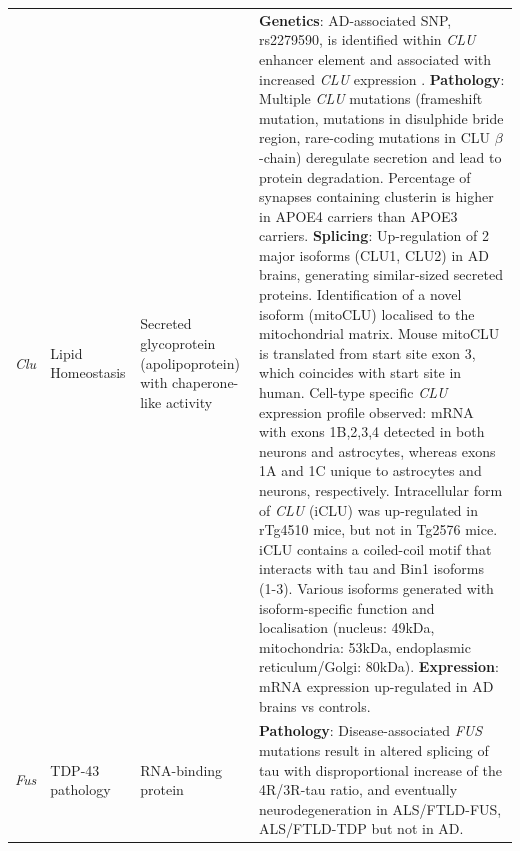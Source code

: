 \begin{landscape}
\begin{longtable}[c]{p{1cm}p{2cm}p{4cm}p{19cm}}
			\centering \textit{Clu} &
			\centering Lipid Homeostasis  &
			\centering Secreted glycoprotein (apolipoprotein) with chaperone-like activity  &	
			\tabitem \textbf{Genetics}: AD-associated SNP, rs2279590, is identified within \textit{CLU} enhancer element and associated with increased \textit{CLU} expression \cite{Padhy2017}.	\newline 	
			\tabitem \textbf{Pathology}: Multiple \textit{CLU} mutations (frameshift mutation, mutations in disulphide bride region, rare-coding mutations in CLU $\beta$-chain) deregulate secretion and lead to protein degradation\cite{Bettens2015}. \newline 
			\tabitem Percentage of synapses containing clusterin is higher in APOE4 carriers than APOE3 carriers\cite{Jackson2019}. \newline 
			\tabitem \textbf{Splicing}: Up-regulation of 2 major isoforms (CLU1, CLU2) in AD brains, generating similar-sized secreted proteins\cite{Ling2012}.\newline 
			\tabitem Identification of a novel isoform (mitoCLU) localised to the mitochondrial matrix. Mouse mitoCLU is translated from start site exon 3, which coincides with start site in human. \newline 
			\tabitem Cell-type specific \textit{CLU} expression profile observed: mRNA with exons 1B,2,3,4 detected in both neurons and astrocytes, whereas exons 1A and 1C unique to astrocytes and neurons, respectively\cite{Herring2019}. \newline 
			\tabitem Intracellular form of \textit{CLU} (iCLU) was up-regulated in rTg4510 mice, but not in Tg2576 mice. iCLU contains a coiled-coil motif that interacts with tau and Bin1 isoforms (1-3).\cite{Zhou2014} \newline		
			\tabitem Various isoforms generated with isoform-specific function and localisation (nucleus: 49kDa, mitochondria: 53kDa, endoplasmic reticulum/Golgi: 80kDa). \newline
			\tabitem \textbf{Expression}: mRNA expression up-regulated in AD brains vs controls.\cite{Karch2012} \\	
			\hdashline[0.5pt/5pt]
			
			\centering \textit{Fus} &
			\centering TDP-43 pathology  &
			\centering RNA-binding protein  &			
			\tabitem \textbf{Pathology}: Disease-associated \textit{FUS} mutations result in altered splicing of tau with disproportional increase of the 4R/3R-tau ratio, and eventually neurodegeneration in ALS/FTLD-FUS, ALS/FTLD-TDP but not in AD\cite{Ishigaki2020}. \\
			

\end{longtable}
\end{landscape}
